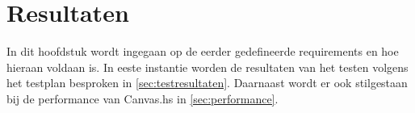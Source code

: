 \chapter{Resultaten} \label{hoofdstuk:resultaten}
In dit hoofdstuk wordt ingegaan op de eerder gedefineerde requirements en hoe hieraan voldaan is. In eeste instantie worden de resultaten van het testen volgens het testplan besproken in \autoref{sec:testresultaten}. Daarnaast wordt er ook stilgestaan bij de performance van Canvas.hs in \autoref{sec:performance}.

